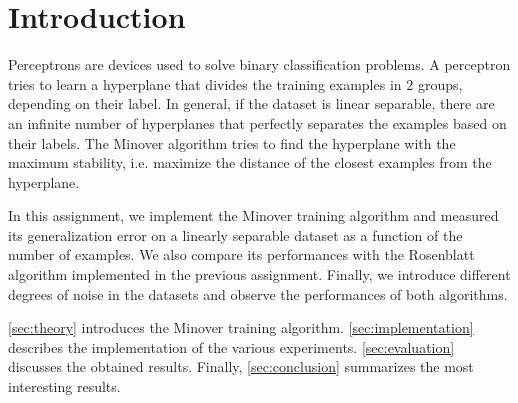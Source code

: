 \section{Introduction}
\label{sec:introduction}

Perceptrons are devices used to solve binary classification problems.
A perceptron tries to learn a hyperplane that divides the training examples in $2$ groups, depending on their label.
In general, if the dataset is linear separable, there are an infinite number of hyperplanes that perfectly separates the examples based on their labels.
The Minover algorithm \cite{minover} tries to find the hyperplane with the maximum stability, i.e. maximize the distance of the closest examples from the hyperplane.

In this assignment, we implement the Minover training algorithm and measured its generalization error on a linearly separable dataset as a function of the number of examples.
We also compare its performances with the Rosenblatt algorithm \cite{rosenblatt} implemented in the previous assignment.
Finally, we introduce different degrees of noise in the datasets and observe the performances of both algorithms.

\cref{sec:theory} introduces the Minover training algorithm.
\cref{sec:implementation} describes the implementation of the various experiments.
\cref{sec:evaluation} discusses the obtained results.
Finally, \cref{sec:conclusion} summarizes the most interesting results.
